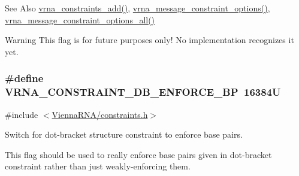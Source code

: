 \begin{DoxySeeAlso}{See Also}
\hyperlink{group__constraints_ga35a401f680969a556858a8dd5f1d07cc}{vrna\-\_\-constraints\-\_\-add()}, \hyperlink{group__constraints_gaa1f20b53bf09ac2e6b0dbb13f7d89670}{vrna\-\_\-message\-\_\-constraint\-\_\-options()}, \hyperlink{group__constraints_gaec7e13fa0465c2acc7a621d1aecb709f}{vrna\-\_\-message\-\_\-constraint\-\_\-options\-\_\-all()} 
\end{DoxySeeAlso}
\begin{DoxyWarning}{Warning}
This flag is for future purposes only! No implementation recognizes it yet. 
\end{DoxyWarning}
\hypertarget{group__constraints_ga29ebe940110d60ab798fdacbcdbbfb7d}{
\subsubsection[{V\-R\-N\-A\-\_\-\-C\-O\-N\-S\-T\-R\-A\-I\-N\-T\-\_\-\-D\-B\-\_\-\-E\-N\-F\-O\-R\-C\-E\-\_\-\-B\-P}]{\setlength{\rightskip}{0pt plus 5cm}\#define V\-R\-N\-A\-\_\-\-C\-O\-N\-S\-T\-R\-A\-I\-N\-T\-\_\-\-D\-B\-\_\-\-E\-N\-F\-O\-R\-C\-E\-\_\-\-B\-P~16384\-U}}\label{group__constraints_ga29ebe940110d60ab798fdacbcdbbfb7d}


{\ttfamily \#include $<$\hyperlink{constraints_8h}{Vienna\-R\-N\-A/constraints.\-h}$>$}



Switch for dot-\/bracket structure constraint to enforce base pairs. 

This flag should be used to really enforce base pairs given in dot-\/bracket constraint rather than just weakly-\/enforcing them.

